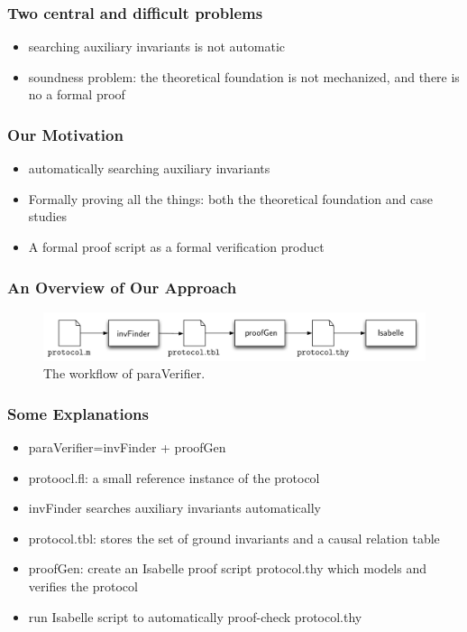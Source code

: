\documentclass{beamer}
\begin{document}
\begin{frame}\frametitle{Two central and difficult problems}
\begin{itemize}
\item  searching auxiliary invariants is not automatic
\item  soundness problem: the theoretical foundation is not mechanized, and there is no  a formal proof
\end{itemize}

\end{frame}

\begin{frame}\frametitle{Our Motivation}

\begin{itemize}
\item automatically searching  auxiliary invariants
\item Formally proving all the things: both the theoretical foundation and case studies
\item A formal proof script as a formal verification product
\end{itemize}
\end{frame}



\begin{frame}\frametitle{An Overview of Our Approach}


\begin{figure}[!t]
\centering
\includegraphics[width=1.0\textwidth]{paraVerifierWorkFlow.pdf}

\caption{The workflow of {\sf paraVerifier}.}
\label{fig:arch}
\end{figure}
\end{frame}



\begin{frame}\frametitle{Some Explanations}

\begin{itemize}
\item {\sf paraVerifier}={\sf invFinder} + {\sf proofGen}

\item protoocl.fl: a small reference instance of the   protocol


\item {\sf invFinder} searches auxiliary invariants automatically

\item   protocol.tbl:  stores the set of ground invariants and a causal relation table

\item {\sf proofGen}: create an Isabelle proof script {\sf protocol.thy} which models and verifies the protocol

\item run Isabelle script to automatically proof-check {\sf protocol.thy}
\end{itemize}

\end{frame}
\end{document}
